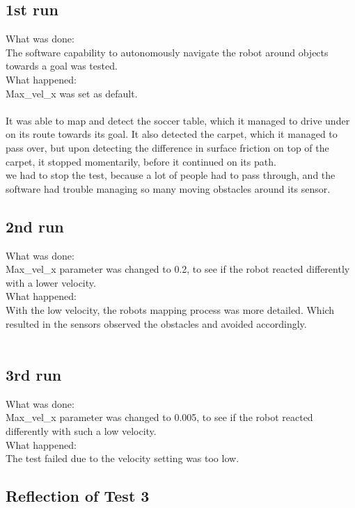 \subsection{1st run}
What was done:\\
The software capability to autonomously navigate the robot around objects towards a goal was tested.\\
 
What happened:\\
Max\_vel\_x was set as default.\\
\\It was able to map and detect  the soccer table, which it managed to drive under on its route towards its goal. It also detected the carpet, which it managed to pass over, but upon detecting the difference in surface friction on top of the carpet, it stopped momentarily, before it continued on its path.\\

we had to stop the test, because a lot of people had to pass through, and the software had trouble managing so many moving obstacles around its sensor.

\subsection{2nd run}
What was done:\\
Max\_vel\_x parameter was changed to 0.2, to see if the robot reacted differently with a lower velocity.
\\
What happened:\\
With the low velocity, the robots mapping process was more detailed. Which resulted in the sensors observed the obstacles and avoided accordingly.\\ 
\\
\subsection{3rd run}
What was done:\\
Max\_vel\_x parameter was changed to 0.005, to see if the robot reacted differently with such a low velocity.
\\
What happened:\\
The test failed due to the velocity setting was too low.\\

\subsection{Reflection of Test 3}

